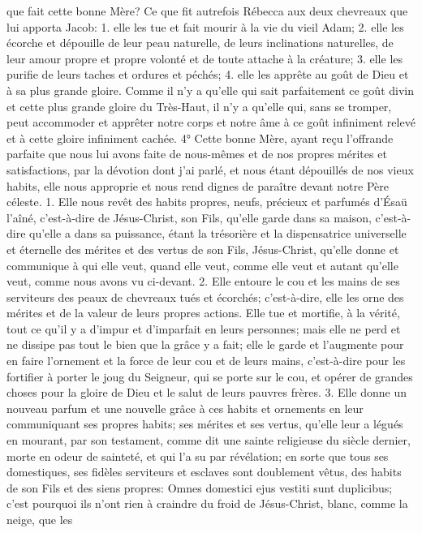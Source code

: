 que fait cette bonne Mère? Ce que fit autrefois Rébecca aux deux chevreaux que lui apporta Jacob: 1. elle les tue
et fait mourir à la vie du vieil Adam; 2. elle les écorche et dépouille de leur peau naturelle, de leurs inclinations
naturelles, de leur amour propre et propre volonté et de toute attache à la créature; 3. elle les purifie de leurs
taches et ordures et péchés; 4. elle les apprête au goût de Dieu et à sa plus grande gloire. Comme il n'y a qu'elle
qui sait parfaitement ce goût divin et cette plus grande gloire du Très-Haut, il n'y a qu'elle qui, sans se tromper,
peut accommoder et apprêter notre corps et notre âme à ce goût infiniment relevé et à cette gloire infiniment
cachée.
 4° Cette bonne Mère, ayant reçu l'offrande parfaite que nous lui avons faite de nous-mêmes et de nos
propres mérites et satisfactions, par la dévotion dont j'ai parlé, et nous étant dépouillés de nos vieux habits, elle
nous approprie et nous rend dignes de paraître devant notre Père céleste. 1. Elle nous revêt des habits propres,
neufs, précieux et parfumés d'Ésaü l'aîné, c'est-à-dire de Jésus-Christ, son Fils, qu'elle garde dans sa maison,
c'est-à-dire qu'elle a dans sa puissance, étant la trésorière et la dispensatrice universelle et éternelle des mérites
et des vertus de son Fils, Jésus-Christ, qu'elle donne et communique à qui elle veut, quand elle veut, comme elle
veut et autant qu'elle veut, comme nous avons vu ci-devant. 2. Elle entoure le cou et les mains de ses serviteurs
des peaux de chevreaux tués et écorchés; c'est-à-dire, elle les orne des mérites et de la valeur de leurs propres
actions. Elle tue et mortifie, à la vérité, tout ce qu'il y a d'impur et d'imparfait en leurs personnes; mais elle ne perd
et ne dissipe pas tout le bien que la grâce y a fait; elle le garde et l'augmente pour en faire l'ornement et la force de
leur cou et de leurs mains, c'est-à-dire pour les fortifier à porter le joug du Seigneur, qui se porte sur le cou, et
opérer de grandes choses pour la gloire de Dieu et le salut de leurs pauvres frères. 3. Elle donne un nouveau
parfum et une nouvelle grâce à ces habits et ornements en leur communiquant ses propres habits; ses mérites et
ses vertus, qu'elle leur a légués en mourant, par son testament, comme dit une sainte religieuse du siècle dernier,
morte en odeur de sainteté, et qui l'a su par révélation; en sorte que tous ses domestiques, ses fidèles serviteurs
et esclaves sont doublement vêtus, des habits de son Fils et des siens propres: Omnes domestici ejus vestiti sunt
duplicibus; c'est pourquoi ils n'ont rien à craindre du froid de Jésus-Christ, blanc, comme la neige, que les
